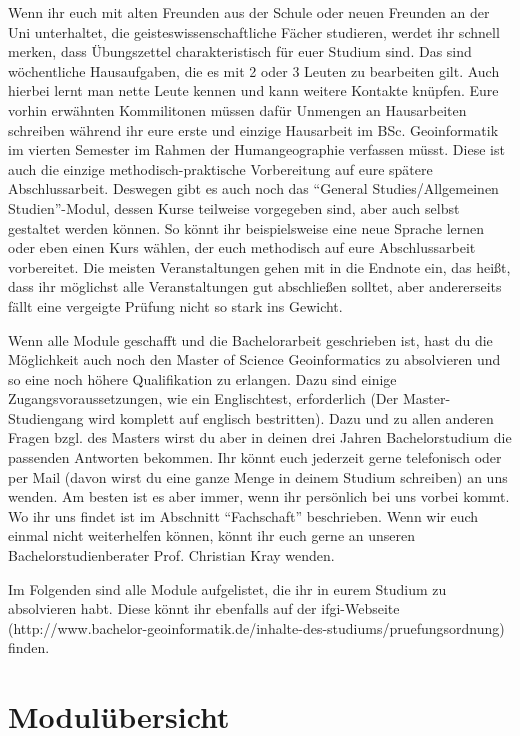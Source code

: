 Wenn ihr euch mit alten Freunden aus der Schule oder neuen Freunden an der Uni unterhaltet, die geisteswissenschaftliche Fächer studieren, werdet ihr schnell merken, dass Übungszettel charakteristisch für euer Studium sind. Das sind wöchentliche Hausaufgaben, die es mit 2 oder 3 Leuten zu bearbeiten gilt. Auch hierbei lernt man nette Leute kennen und kann weitere Kontakte knüpfen. Eure vorhin erwähnten Kommilitonen müssen dafür Unmengen an Hausarbeiten schreiben während ihr eure erste und einzige Hausarbeit im BSc. Geoinformatik im vierten Semester im Rahmen der Humangeographie verfassen müsst. Diese ist auch die einzige methodisch-praktische Vorbereitung auf eure spätere Abschlussarbeit. Deswegen gibt es auch noch das "`General Studies/Allgemeinen Studien"'-Modul, dessen Kurse teilweise vorgegeben sind, aber auch selbst gestaltet werden können. So könnt ihr beispielsweise eine neue Sprache lernen oder eben einen Kurs wählen, der euch methodisch auf eure Abschlussarbeit vorbereitet. Die meisten Veranstaltungen gehen mit in die Endnote ein, das heißt, dass ihr möglichst alle Veranstaltungen gut abschließen solltet, aber andererseits fällt eine vergeigte Prüfung nicht so stark ins Gewicht.

Wenn alle Module geschafft und die Bachelorarbeit geschrieben ist, hast du die Möglichkeit auch noch den Master of Science Geoinformatics zu absolvieren und so eine noch höhere Qualifikation zu erlangen. Dazu sind einige Zugangsvoraussetzungen, wie ein Englischtest, erforderlich (Der Master-Studiengang wird komplett auf englisch bestritten). Dazu und zu allen anderen Fragen bzgl. des Masters wirst du aber in deinen drei Jahren Bachelorstudium die passenden Antworten bekommen. Ihr könnt euch jederzeit gerne telefonisch oder per Mail (davon wirst du eine ganze Menge in deinem Studium schreiben) an uns wenden. Am besten ist es aber immer, wenn ihr persönlich bei uns vorbei kommt. Wo ihr uns findet ist im Abschnitt "`Fachschaft"' beschrieben. Wenn wir euch einmal nicht weiterhelfen können, könnt ihr euch gerne an unseren Bachelorstudienberater Prof. Christian Kray wenden. 

Im Folgenden sind alle Module aufgelistet, die ihr in eurem Studium zu absolvieren habt. Diese könnt ihr ebenfalls auf der ifgi-Webseite (http://www.bachelor-geoinformatik.de/inhalte-des-studiums/pruefungsordnung) ﬁnden.

\newpage

\section{Modulübersicht}

